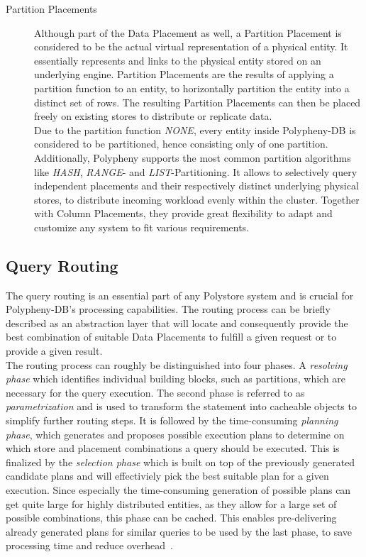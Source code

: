 \begin{description}
   

    \item [Partition Placements] Although part of the Data Placement as well, a Partition Placement is considered to be the actual virtual representation of a physical entity.
    It essentially represents and links to the physical entity stored on an underlying engine. Partition Placements are the results of applying a partition function to an entity,
    to horizontally partition the entity into a distinct set of rows. The resulting Partition Placements can then be placed freely on existing stores to distribute or replicate data.\\
    Due to the partition function \emph{NONE}, every entity inside Polypheny-DB is considered to be partitioned, hence consisting only of one partition.
    Additionally, Polypheny supports the most common partition algorithms like \emph{HASH}, \emph{RANGE}- and \emph{LIST}-Partitioning. 
    It allows to selectively query independent placements and their respectively distinct underlying physical stores, to distribute incoming workload evenly within the cluster.
    Together with Column Placements, they provide great flexibility to adapt and customize any system to fit various requirements.
    
\end{description}





\subsection{Query Routing}
\label{sec:routing}

The query routing is an essential part of any Polystore system and is crucial for Polypheny-DB's processing capabilities.
The routing process can be briefly described as an abstraction layer that will locate and consequently provide the best combination of suitable Data Placements to fulfill a given request 
or to provide a given result. \\
The routing process can roughly be distinguished into four phases. A \emph{resolving phase} which identifies individual building blocks, such as partitions, which are necessary 
for the query execution. The second phase is referred to as \emph{parametrization} and is used to transform the statement into cacheable objects to simplify further routing steps.
It is followed by the time-consuming \emph{planning phase}, which generates and proposes possible execution plans to determine on which store and placement combinations a query should be executed.
This is finalized by the \emph{selection phase} which is built on top of the previously generated candidate plans and will effectiviely pick the best suitable plan for a 
given execution. Since especially the time-consuming generation of possible plans can get quite large for highly distributed entities, as they allow for a large set of 
possible combinations, this phase can be cached.
This enables pre-delivering already generated plans for similar queries to be used by the last phase, to save processing time and reduce overhead~\cite{vogt_dis_2022}.

